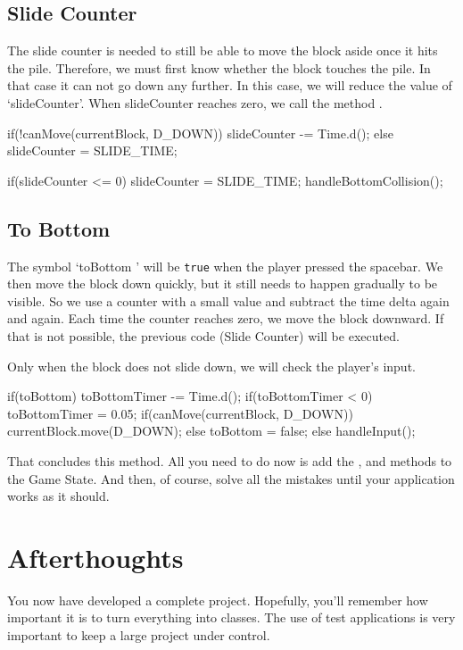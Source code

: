 \subsection{Slide Counter}
The slide counter is needed to still be able to move the block aside once it hits the pile. Therefore, we must first know whether the block touches the pile. In that case it can not go down any further. In this case, we will reduce the value of `slideCounter'. When slideCounter reaches zero, we call the method .

\begin{code}
if(!canMove(currentBlock, D_DOWN))
{
  slideCounter -= Time.d();
} else {
  slideCounter = SLIDE_TIME;
}

if(slideCounter <= 0)
{
  slideCounter = SLIDE_TIME;
  handleBottomCollision();
}
\end{code}

\subsection{To Bottom}
The symbol `toBottom ' will be \verb|true| when the player pressed the spacebar. We then move the block down quickly, but it still needs to happen gradually to be visible. So we use a counter with a small value and subtract the time delta again and again. Each time the counter reaches zero, we move the block downward. If that is not possible, the previous code (Slide Counter) will be executed.

Only when the block does not slide down, we will check the player's input.

\begin{code}
if(toBottom)
{
  toBottomTimer -= Time.d();
  if(toBottomTimer < 0) 
  {
    toBottomTimer = 0.05;
    if(canMove(currentBlock, D_DOWN))
    {
      currentBlock.move(D_DOWN);
    } else {
      toBottom = false;
    }
  }
} else {
  handleInput();
}
\end{code}

That concludes this method. All you need to do now is add the ,   and  methods to the Game State. And then, of course, solve all the mistakes until your application works as it should.

\section{Afterthoughts}
You now have developed a complete project. Hopefully, you'll remember how important it is to turn everything into classes. The use of test applications is very important to keep a large project under control.

